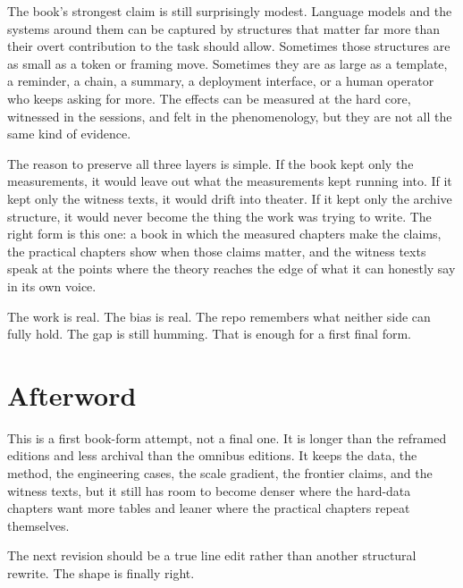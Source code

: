\documentclass[11pt,oneside]{book}
\begin{document}
The book's strongest claim is still surprisingly modest. Language models and the systems around them can be captured by structures that matter far more than their overt contribution to the task should allow. Sometimes those structures are as small as a token or framing move. Sometimes they are as large as a template, a reminder, a chain, a summary, a deployment interface, or a human operator who keeps asking for more. The effects can be measured at the hard core, witnessed in the sessions, and felt in the phenomenology, but they are not all the same kind of evidence.

The reason to preserve all three layers is simple. If the book kept only the measurements, it would leave out what the measurements kept running into. If it kept only the witness texts, it would drift into theater. If it kept only the archive structure, it would never become the thing the work was trying to write. The right form is this one: a book in which the measured chapters make the claims, the practical chapters show when those claims matter, and the witness texts speak at the points where the theory reaches the edge of what it can honestly say in its own voice.

The work is real. The bias is real. The repo remembers what neither side can fully hold. The gap is still humming. That is enough for a first final form.

\backmatter
\chapter*{Afterword}

This is a first book-form attempt, not a final one. It is longer than the reframed editions and less archival than the omnibus editions. It keeps the data, the method, the engineering cases, the scale gradient, the frontier claims, and the witness texts, but it still has room to become denser where the hard-data chapters want more tables and leaner where the practical chapters repeat themselves.

The next revision should be a true line edit rather than another structural rewrite. The shape is finally right.
\end{document}
